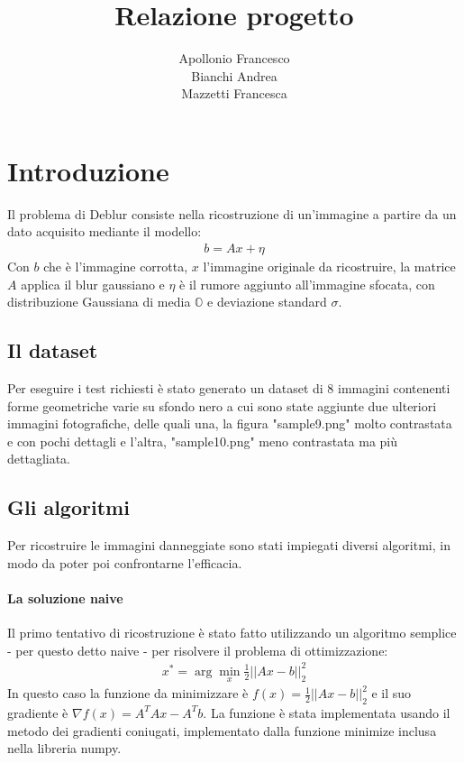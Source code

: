 \documentclass[12pt]{article}
\title{Relazione progetto}
\author{Apollonio Francesco\\Bianchi Andrea\\Mazzetti Francesca}
\begin{document}
\begin{titlepage}
\maketitle
{}
\end{titlepage}
\newpage
\tableofcontents
\newpage
{}

\section{Introduzione}

    Il problema di Deblur consiste nella ricostruzione di un'immagine a partire da un dato acquisito mediante il modello:
    \begin{align*}
        b = Ax + \eta
    \end{align*}
    Con $b$ che è l'immagine corrotta, $x$ l'immagine originale da ricostruire, la matrice $A$ applica il blur gaussiano e $\eta$ è il rumore aggiunto all'immagine sfocata, con distribuzione Gaussiana di media $\mathbb{O}$ e deviazione standard $\sigma$.
    
    \subsection{Il dataset}
    Per eseguire i test richiesti è stato generato un dataset di 8 immagini contenenti forme geometriche varie su sfondo nero a cui sono state aggiunte due ulteriori immagini fotografiche, delle quali una, la figura "sample9.png" molto contrastata e con pochi dettagli e l'altra, "sample10.png" meno contrastata ma più dettagliata.
    
    \subsection{Gli algoritmi}
    Per ricostruire le immagini danneggiate sono stati impiegati diversi algoritmi, in modo da poter poi confrontarne l'efficacia.
    
    \paragraph{La soluzione naive}
    Il primo tentativo di ricostruzione è stato fatto utilizzando un algoritmo semplice - per questo detto naive - per risolvere il problema di ottimizzazione:
    \begin{align*}
        x^* = \arg\min_x \frac{1}{2} ||Ax - b||_2^2
    \end{align*}
    In questo caso la funzione da minimizzare è $f(x) = \frac{1}{2} ||Ax - b||_2^2$ e il suo gradiente è $\nabla f(x) = A^TAx - A^Tb$. La funzione è stata implementata usando il metodo dei gradienti coniugati, implementato dalla funzione minimize inclusa nella libreria numpy.
    
\end{document}
